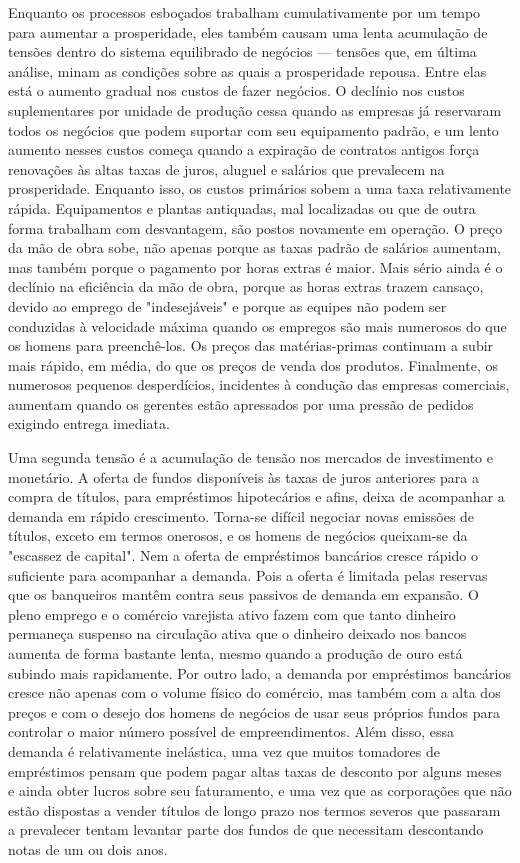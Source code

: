 \documentclass[12pt]{article}
\begin{document}
Enquanto os processos esboçados trabalham cumulativamente por um tempo para aumentar a prosperidade, eles também causam uma lenta acumulação de tensões dentro do sistema equilibrado de negócios — tensões que, em última análise, minam as condições sobre as quais a prosperidade repousa. Entre elas está o aumento gradual nos custos de fazer negócios. O declínio nos custos suplementares por unidade de produção cessa quando as empresas já reservaram todos os negócios que podem suportar com seu equipamento padrão, e um lento aumento nesses custos começa quando a expiração de contratos antigos força renovações às altas taxas de juros, aluguel e salários que prevalecem na prosperidade. Enquanto isso, os custos primários sobem a uma taxa relativamente rápida. Equipamentos e plantas antiquadas, mal localizadas ou que de outra forma trabalham com desvantagem, são postos novamente em operação. O preço da mão de obra sobe, não apenas porque as taxas padrão de salários aumentam, mas também porque o pagamento por horas extras é maior. Mais sério ainda é o declínio na eficiência da mão de obra, porque as horas extras trazem cansaço, devido ao emprego de "indesejáveis" e porque as equipes não podem ser conduzidas à velocidade máxima quando os empregos são mais numerosos do que os homens para preenchê-los. Os preços das matérias-primas continuam a subir mais rápido, em média, do que os preços de venda dos produtos. Finalmente, os numerosos pequenos desperdícios, incidentes à condução das empresas comerciais, aumentam quando os gerentes estão apressados por uma pressão de pedidos exigindo entrega imediata.

Uma segunda tensão é a acumulação de tensão nos mercados de investimento e monetário. A oferta de fundos disponíveis às taxas de juros anteriores para a compra de títulos, para empréstimos hipotecários e afins, deixa de acompanhar a demanda em rápido crescimento. Torna-se difícil negociar novas emissões de títulos, exceto em termos onerosos, e os homens de negócios queixam-se da "escassez de capital". Nem a oferta de empréstimos bancários cresce rápido o suficiente para acompanhar a demanda. Pois a oferta é limitada pelas reservas que os banqueiros mantêm contra seus passivos de demanda em expansão. O pleno emprego e o comércio varejista ativo fazem com que tanto dinheiro permaneça suspenso na circulação ativa que o dinheiro deixado nos bancos aumenta de forma bastante lenta, mesmo quando a produção de ouro está subindo mais rapidamente. Por outro lado, a demanda por empréstimos bancários cresce não apenas com o volume físico do comércio, mas também com a alta dos preços e com o desejo dos homens de negócios de usar seus próprios fundos para controlar o maior número possível de empreendimentos. Além disso, essa demanda é relativamente inelástica, uma vez que muitos tomadores de empréstimos pensam que podem pagar altas taxas de desconto por alguns meses e ainda obter lucros sobre seu faturamento, e uma vez que as corporações que não estão dispostas a vender títulos de longo prazo nos termos severos que passaram a prevalecer tentam levantar parte dos fundos de que necessitam descontando notas de um ou dois anos.
\end{document}
